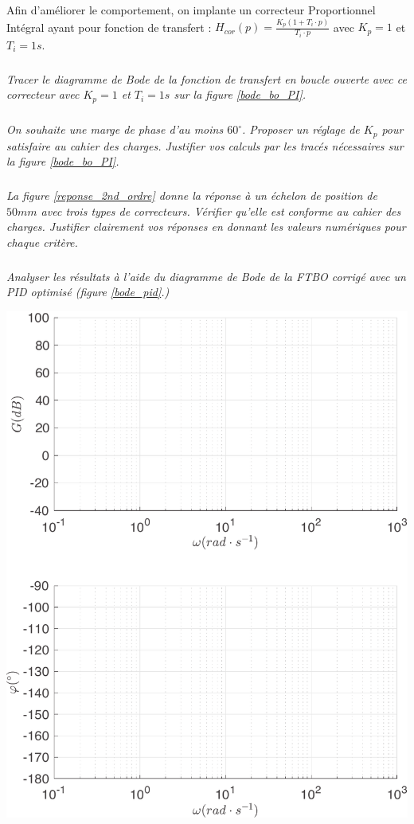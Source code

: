 \documentclass[10pt,fleqn]{article} %
\begin{document}
\begin{multicols}{2}
Afin d'améliorer le comportement, on implante un correcteur Proportionnel Intégral ayant pour fonction de transfert : $H_{cor}(p)=\frac{K_p\left(1+T_i\cdot p\right)}{T_i\cdot p}$ avec $K_p=1$ et $T_i = 1 s$.

\subparagraph{}\textit{Tracer le diagramme de Bode de la fonction de transfert en boucle ouverte avec ce correcteur avec $K_p=1$ et $T_i = 1 s$ sur la figure \ref{bode_bo_PI}.}

\subparagraph{}\textit{On souhaite une marge de phase d'au moins $60^{\circ}$. Proposer un réglage de $K_p$ pour satisfaire au cahier des charges. Justifier vos calculs par les tracés nécessaires sur la figure \ref{bode_bo_PI}.}

\subparagraph{}\textit{La figure \ref{reponse_2nd_ordre} donne la réponse à un échelon de position de $50 mm$ avec trois types de correcteurs. Vérifier qu'elle est conforme au cahier des charges. Justifier clairement vos réponses en donnant les valeurs numériques pour chaque critère.}

\subparagraph{}\textit{Analyser les résultats à l'aide du diagramme de Bode de la FTBO corrigé avec un PID optimisé (figure \ref{bode_pid}.)}

\begin{center}
\includegraphics[width=1.0\linewidth]{images/matlab/bode_total0.pdf}
\end{center}


\end{multicols}
\end{document}
